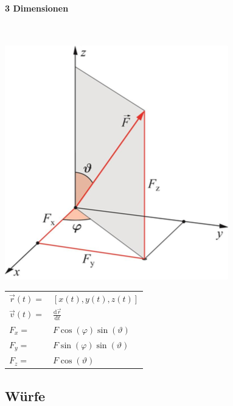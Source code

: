 \documentclass[a4paper]{scrartcl}
\begin{document}
\paragraph{3 Dimensionen} \hfill \\
	\begin{multicols}{2}
		\includegraphics[width=0.8\linewidth]{img/darstellungKraefte.png}
		
		\begin{tabu} {l X}
			$\vec{r}(t) =$ & $ \left[ x(t),y(t),z(t)\right]$ \\
			$\vec{v}(t) =$ & $\frac{\text{d}\vec{r}}{\text{d}t}$ \\
			$F_x = $ & $F\cos(\varphi)\sin(\vartheta)$ \\
			$F_y = $ & $F\sin(\varphi)\sin(\vartheta)$ \\
			$F_z = $ & $F\cos(\vartheta)$
		\end{tabu}
	\end{multicols}

\subsection{Würfe}
\end{document}
